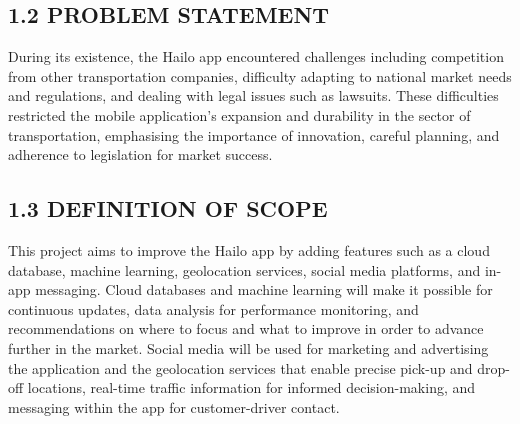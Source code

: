 \documentclass[9pt]{report}
\begin{document}
\subsection*{1.2 PROBLEM STATEMENT}
During its existence, the Hailo app encountered challenges including competition from other transportation companies, difficulty adapting to national market needs and regulations, and dealing with legal issues such as lawsuits. These difficulties restricted the mobile application's expansion and durability in the sector of transportation, emphasising the importance of innovation, careful planning, and adherence to legislation for market success.
\subsection*{1.3 DEFINITION OF SCOPE}
This project aims to improve the Hailo app by adding features such as a cloud database, machine learning, geolocation services, social media platforms, and in-app messaging. Cloud databases and machine learning will make it possible for continuous updates, data analysis for performance monitoring, and recommendations on where to focus and what to improve in order to advance further in the market. Social media will be used for marketing and advertising the application and the geolocation services that enable precise pick-up and drop-off locations, real-time traffic information for informed decision-making, and messaging within the app for customer-driver contact.
\end{document}
